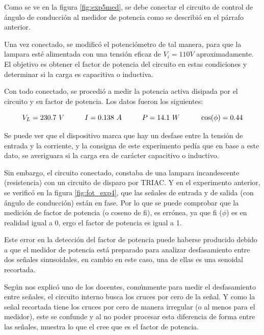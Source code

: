 Como se ve en la figura \ref{fig:exp5med}, se debe conectar el circuito de control de ángulo de conducción al medidor de potencia como se describió en el párrafo anterior.

Una vez conectado, se modificó el potenciómetro de tal manera, para que la lampara esté alimentada con una tensión eficaz de $V_i=110V$ aproximadamente. El objetivo es obtener el factor de potencia del circuito en estas condiciones y determinar si la carga es capacitiva o inductiva.


Con todo conectado, se procedió a medir la potencia activa disipada por el circuito y su factor de potencia. Los datos fueron los siguientes:

\begin{equation*}
    V_L = 230.7 ~V \hspace{10mm} I = 0.138 ~A \hspace{10mm}
    P = 14.1 ~W \hspace{10mm} \cos (\phi) = 0.44
\end{equation*}

Se puede ver que el dispositivo marca que hay un desfase entre la tensión de entrada y la corriente, y la consigna de este experimento pedía que en base a este dato, se averiguara si la carga era de carácter capacitivo o inductivo.

Sin embargo, el circuito conectado, constaba de una lampara incandescente (resistencia) con un circuito de disparo por TRIAC. Y en el experimento anterior, se verificó en la figura \ref{fig:fot_exp4}, que las señales de entrada y de salida (con ángulo de conducción) están en fase. Por lo que se puede comprobar que la medición de factor de potencia (o coseno de fi), es errónea, ya que fi ($\phi$) es en realidad igual a 0, ergo el factor de potencia es igual a 1.

Este error en la detección del factor de potencia puede haberse producido debido a que el medidor de potencia está preparado para analizar desfasamiento entre dos señales sinusoidales, en cambio en este caso, una de ellas es una senoidal recortada. 

Según nos explicó uno de los docentes, comúnmente para medir el desfasamiento entre señales, el circuito interno busca los cruces por cero de la señal. Y como la señal recortada tiene los cruces por cero de manera irregular (o al menos para el medidor), este se confunde y al no poder procesar esta diferencia de forma entre las señales, muestra lo que el cree que es el factor de potencia.


